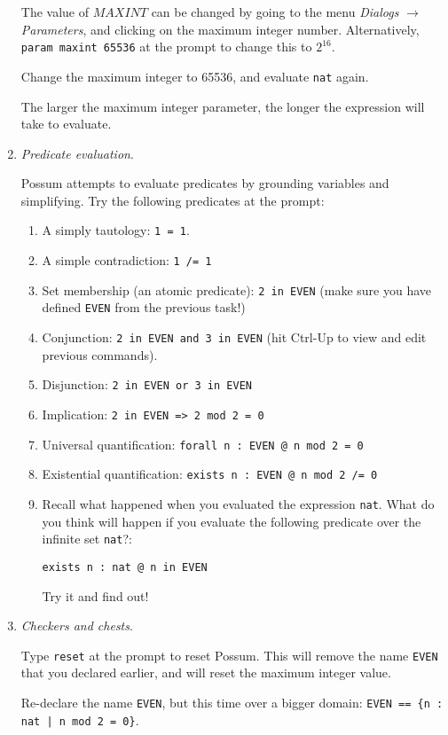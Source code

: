 \documentclass{article}
\begin{document}
\begin{enumerate}
The value of $MAXINT$ can be changed by going to the menu \emph{Dialogs} $\rightarrow$ \emph{Parameters}, and clicking on the maximum integer number. Alternatively, \texttt{param maxint  65536} at the prompt to change this to $2^{16}$.

  Change the maximum integer to 65536, and evaluate \texttt{nat} again. 

  The larger the maximum integer parameter, the longer the expression will take to evaluate.

 \item \emph{Predicate evaluation}.

   Possum attempts to evaluate predicates by grounding variables and simplifying. Try the following predicates at the prompt:

 \begin{enumerate}
   \item A simply tautology: \texttt{1 = 1}.
   \item A simple contradiction: \texttt{1 /= 1}
   \item Set membership (an atomic predicate): \texttt{2 in EVEN} (make sure you have defined \texttt{EVEN} from the previous task!)
   \item Conjunction: \texttt{2 in EVEN and 3 in EVEN} (hit Ctrl-Up to view and edit previous commands).
   \item Disjunction: \texttt{2 in EVEN or 3 in EVEN}
   \item Implication: \texttt{2 in EVEN => 2 mod 2 = 0}
   \item Universal quantification: \texttt{forall n : EVEN @ n mod 2 = 0}
   \item Existential quantification: \texttt{exists n : EVEN @ n mod 2 /= 0}
   \item Recall what happened when  you evaluated the expression \texttt{nat}. What do you think will happen if you evaluate the following predicate over the infinite set \texttt{nat}?: 

   \quad\quad \texttt{exists n : nat @ n in EVEN}

 Try it and find out!
  \end{enumerate}

 \item \emph{Checkers and chests}.

  Type \texttt{reset} at the prompt to reset Possum. This will remove the name \texttt{EVEN} that you declared earlier, and will reset the maximum integer value.

 Re-declare the name \texttt{EVEN}, but this time over a bigger domain: \texttt{EVEN == \{n : nat | n mod 2 = 0\}}.


\end{enumerate}
\end{document}
